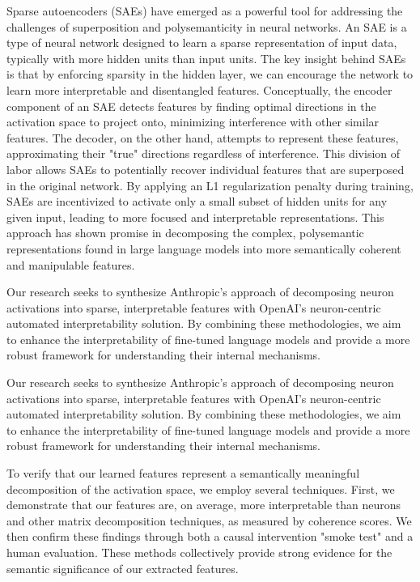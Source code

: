 Sparse autoencoders (SAEs) have emerged as a powerful tool for addressing the challenges of superposition and polysemanticity in neural networks. An SAE is a type of neural network designed to learn a sparse representation of input data, typically with more hidden units than input units. The key insight behind SAEs is that by enforcing sparsity in the hidden layer, we can encourage the network to learn more interpretable and disentangled features. Conceptually, the encoder component of an SAE detects features by finding optimal directions in the activation space to project onto, minimizing interference with other similar features. The decoder, on the other hand, attempts to represent these features, approximating their "true" directions regardless of interference. This division of labor allows SAEs to potentially recover individual features that are superposed in the original network. By applying an L1 regularization penalty during training, SAEs are incentivized to activate only a small subset of hidden units for any given input, leading to more focused and interpretable representations. This approach has shown promise in decomposing the complex, polysemantic representations found in large language models into more semantically coherent and manipulable features. \cite{bricken2023monosemanticity}

Our research seeks to synthesize Anthropic's approach of decomposing neuron activations into sparse, interpretable features with OpenAI's neuron-centric automated interpretability solution. By combining these methodologies, we aim to enhance the interpretability of fine-tuned language models and provide a more robust framework for understanding their internal mechanisms.

Our research seeks to synthesize Anthropic's approach of decomposing neuron activations into sparse, interpretable features with OpenAI's neuron-centric automated interpretability solution. By combining these methodologies, we aim to enhance the interpretability of fine-tuned language models and provide a more robust framework for understanding their internal mechanisms.

To verify that our learned features represent a semantically meaningful decomposition of the activation space, we employ several techniques. First, we demonstrate that our features are, on average, more interpretable than neurons and other matrix decomposition techniques, as measured by coherence scores. We then confirm these findings through both a causal intervention "smoke test" and a human evaluation. These methods collectively provide strong evidence for the semantic significance of our extracted features.